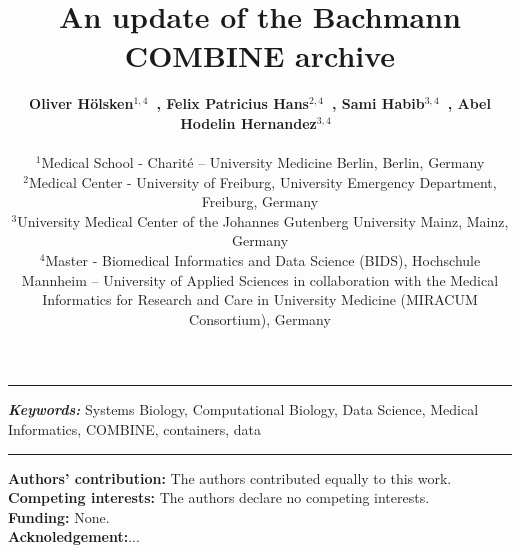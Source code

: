 \documentclass[a4paper, 12pt]{article}
\title{An update of the Bachmann COMBINE archive}
\date{} %
\providecommand{\keywords}[1]
{
  \small	
  \textbf{\textit{Keywords: }} #1
}
\begin{document}
\maketitle

  \noindent\author{\textbf{Oliver H\"olsken$^{1,4}$~, Felix Patricius Hans$^{2,4}$~, Sami Habib$^{3,4}$~, Abel Hodelin Hernandez$^{3,4}$~} \\ \\
	\small $^{1}$Medical School - Charité – University Medicine Berlin, Berlin, Germany \\
	\small $^{2}$Medical Center - University of Freiburg, University Emergency Department, Freiburg, Germany \\
	\small $^{3}$University Medical Center of the Johannes Gutenberg University Mainz, Mainz, Germany \\
	\small $^{4}$Master - Biomedical Informatics and Data Science (BIDS), Hochschule Mannheim – University of Applied Sciences in collaboration with the Medical Informatics for Research and Care in University Medicine (MIRACUM Consortium), Germany \\
}

\hrule

 \hspace{10pt}

\noindent\keywords{Systems Biology, Computational Biology, Data Science, Medical Informatics, COMBINE, containers, data}

\hrule

\newpage








\noindent\small \textbf{Authors' contribution:} The authors contributed equally to this work. \\ 
\noindent\small \textbf{Competing interests:} The authors declare no competing interests.\\
\noindent\small \textbf{Funding:} None.\\
\noindent\small \textbf{Acknoledgement:}...



\nocite{*}           %
\printbibliography 
\end{document}

